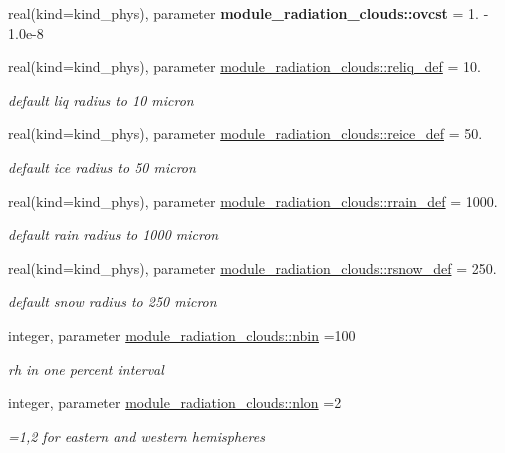\begin{DoxyCompactItemize}
real(kind=kind\+\_\+phys), parameter {\bfseries module\+\_\+radiation\+\_\+clouds\+::ovcst} = 1. -\/ 1.\+0e-\/8
\item 
real(kind=kind\+\_\+phys), parameter \hyperlink{group__module__radiation__clouds_ga1768a85f4d8af2ad40b62ae6e6667c1e}{module\+\_\+radiation\+\_\+clouds\+::reliq\+\_\+def} = 10.
\begin{DoxyCompactList}\small\item\em default liq radius to 10 micron \end{DoxyCompactList}\item 
real(kind=kind\+\_\+phys), parameter \hyperlink{group__module__radiation__clouds_ga721e0fb4a34774f5b61f567b9cad8e7b}{module\+\_\+radiation\+\_\+clouds\+::reice\+\_\+def} = 50.
\begin{DoxyCompactList}\small\item\em default ice radius to 50 micron \end{DoxyCompactList}\item 
real(kind=kind\+\_\+phys), parameter \hyperlink{group__module__radiation__clouds_ga93fcaedae02c0f9c4de9f39061379d6b}{module\+\_\+radiation\+\_\+clouds\+::rrain\+\_\+def} = 1000.
\begin{DoxyCompactList}\small\item\em default rain radius to 1000 micron \end{DoxyCompactList}\item 
real(kind=kind\+\_\+phys), parameter \hyperlink{group__module__radiation__clouds_ga2b68c4a206e17cb59597f6c4dffc7c1a}{module\+\_\+radiation\+\_\+clouds\+::rsnow\+\_\+def} = 250.
\begin{DoxyCompactList}\small\item\em default snow radius to 250 micron \end{DoxyCompactList}\item 
integer, parameter \hyperlink{group__module__radiation__clouds_gad2947b3c0a8382fbe12b76dd68b290e0}{module\+\_\+radiation\+\_\+clouds\+::nbin} =100
\begin{DoxyCompactList}\small\item\em rh in one percent interval \end{DoxyCompactList}\item 
integer, parameter \hyperlink{group__module__radiation__clouds_gab4d14edea12bbcda5361cad523386c7c}{module\+\_\+radiation\+\_\+clouds\+::nlon} =2
\begin{DoxyCompactList}\small\item\em =1,2 for eastern and western hemispheres \end{DoxyCompactList}\item 

\end{DoxyCompactItemize}

